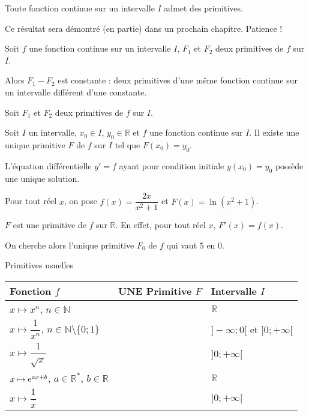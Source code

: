\documentclass[11pt,fleqn, openany]{book} %
\begin{document}
\begin{theorem}Toute fonction continue sur un intervalle $I$ admet des primitives.\end{theorem}

Ce résultat sera démontré (en partie) dans un prochain chapitre. Patience !

\begin{proposition}Soit $f$ une fonction continue sur un intervalle $I$, $F_1$ et $F_2$ deux primitives de $f$ sur $I$. 

Alors $F_1-F_2$ est constante : deux primitives d'une même fonction continue sur un intervalle différent d'une constante.\end{proposition}

\begin{demonstration} Soit $F_1$ et $F_2$ deux primitives de $f$ sur $I$.

\vskip50pt
\end{demonstration}

\begin{proposition}Soit $I$ un intervalle, $x_0\in I$, $y_0 \in \mathbb{R}$ et $f$ une fonction continue sur $I$. Il existe une unique primitive $F$ de $f$ sur $I$ tel que $F(x_0)=y_0$.

L'équation différentielle $y'=f$ ayant pour condition initiale $y(x_0)=y_0$ possède une unique solution.\end{proposition}


\begin{example} Pour tout réel $x$, on pose $f(x)=\dfrac{2x}{x^2+1}$ et $F(x)=\ln(x^2+1)$. 

$F$ est une primitive de $f$ sur $\mathbb{R}$. En effet, pour tout réel $x$, $F'(x)=f(x)$.

On cherche alors l'unique primitive $F_0$ de $f$ qui vaut 5 en 0. 

\vskip90pt

\vspace{-0.5cm}\end{example}



\begin{proposition}Primitives usuelles
\vskip10pt
\renewcommand{\arraystretch}{2}
\begin{tabularx}{\linewidth}{|X|X|X|}

\hline
Fonction $f$ & \textbf{UNE} Primitive $F$ & Intervalle $I$ \\
\hline
$x \mapsto x^n$, $n\in \mathbb{N}$ &  & $\mathbb{R}$ \\
\hline
$x \mapsto \dfrac{1}{x^n}$, $n\in \mathbb{N}\setminus\{0;1\}$ & & $]-\infty;0[$ et $]0;+\infty[$ \\
\hline
$x\mapsto \dfrac{1}{\sqrt{x}}$ &  & $]0;+\infty[$ \\
\hline
$x \mapsto \mathrm{e}^{ax+b}$, $a\in \mathbb{R}^*$, $b\in \mathbb{R}$ &  & $\mathbb{R}$ \\
\hline
$x \mapsto \dfrac{1}{x}$ &  & $]0;+\infty[$ \\
\hline
\end{tabularx}\end{proposition}
\end{document}
